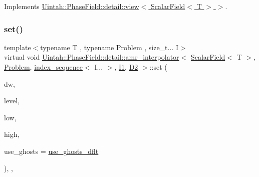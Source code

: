 Implements \hyperlink{classUintah_1_1PhaseField_1_1detail_1_1view_3_01ScalarField_3_01T_01_4_01_4_ae90ea8b33fde8515a1f2e8f5c03c0166}{Uintah\+::\+Phase\+Field\+::detail\+::view$<$ Scalar\+Field$<$ T $>$ $>$}.

\mbox{\label{classUintah_1_1PhaseField_1_1detail_1_1amr__interpolator_3_01ScalarField_3_01T_01_4_00_01Problemd2db9de1754b5450c93c191a9275f5ed_a014b41daf40384377d58ba9ada6a42ba}} 
\subsubsection{\texorpdfstring{set()}{set()}\hspace{0.1cm}{\footnotesize\ttfamily [2/2]}}
{\footnotesize\ttfamily template$<$typename T , typename Problem , size\+\_\+t... I$>$ \\
virtual void \hyperlink{classUintah_1_1PhaseField_1_1detail_1_1amr__interpolator}{Uintah\+::\+Phase\+Field\+::detail\+::amr\+\_\+interpolator}$<$ \hyperlink{structUintah_1_1PhaseField_1_1ScalarField}{Scalar\+Field}$<$ T $>$, \hyperlink{classUintah_1_1PhaseField_1_1Problem}{Problem}, \hyperlink{namespaceUintah_1_1PhaseField_a237de804d99512e50613aff7c94a9461}{index\+\_\+sequence}$<$ I... $>$, \hyperlink{namespaceUintah_1_1PhaseField_a547ce3002aa97fbd3ef3192a6eec8406a66f19efe774b0d2b6e5844eb2d83d305}{I1}, \hyperlink{namespaceUintah_1_1PhaseField_a12bfc68444894dffdf0cb8d9cf0cc76aa1a451dae278b0103a94105c8776e9a67}{D2} $>$\+::set (\begin{DoxyParamCaption}\item[{Data\+Warehouse $\ast$}]{dw,  }\item[{const Level $\ast$}]{level,  }\item[{const Int\+Vector \&}]{low,  }\item[{const Int\+Vector \&}]{high,  }\item[{bool}]{use\+\_\+ghosts = {\ttfamily \hyperlink{classUintah_1_1PhaseField_1_1detail_1_1amr__interpolator_3_01ScalarField_3_01T_01_4_00_01Problemd2db9de1754b5450c93c191a9275f5ed_a05a1e360547dde624240ae943f6ced4b}{use\+\_\+ghosts\+\_\+dflt}} }\end{DoxyParamCaption})\hspace{0.3cm}{\ttfamily [inline]}, {\ttfamily [override]}, {\ttfamily [virtual]}}




